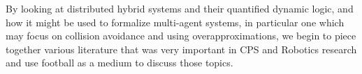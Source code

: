 By looking at distributed hybrid systems and their quantified dynamic logic, and how it might be used to formalize multi-agent systems, in particular one which may focus on collision avoidance and using overapproximations, we begin to piece together various literature that was very important in CPS and Robotics research and use football as a medium to discuss those topics.
